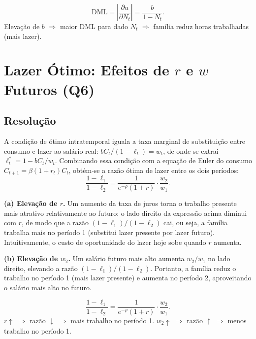 \documentclass[12pt, a4paper]{article}
\begin{document}
\begin{resultbox}[title={Desutilidade Marginal do Trabalho (Q5)}]
\[
\text{DML} = \left|\frac{\partial u}{\partial N_t}\right| = \frac{b}{1-N_t}.
\]
Elevação de $b$ $\Rightarrow$ maior DML para dado $N_t$ $\Rightarrow$ família reduz horas trabalhadas (mais lazer).
\end{resultbox}

\section{Lazer Ótimo: Efeitos de $r$ e $w$ Futuros (Q6)}

\subsection*{Resolução}

A condição de ótimo intratemporal iguala a taxa marginal de substituição entre consumo e lazer ao salário real: $bC_t/(1-\ell_t) = w_t$, de onde se extrai $\ell_t^* = 1 - bC_t/w_t$. Combinando essa condição com a equação de Euler do consumo $C_{t+1} = \beta(1+r_t)C_t$, obtém-se a razão ótima de lazer entre os dois períodos:
\[
\frac{1-\ell_1}{1-\ell_2} = \frac{1}{e^{-\rho}(1+r)}\cdot\frac{w_2}{w_1}.
\]

\textbf{(a) Elevação de $r$.} Um aumento da taxa de juros torna o trabalho presente mais atrativo relativamente ao futuro: o lado direito da expressão acima diminui com $r$, de modo que a razão $(1-\ell_1)/(1-\ell_2)$ cai, ou seja, a família trabalha mais no período 1 (substitui lazer presente por lazer futuro). Intuitivamente, o custo de oportunidade do lazer hoje sobe quando $r$ aumenta.

\textbf{(b) Elevação de $w_2$.} Um salário futuro mais alto aumenta $w_2/w_1$ no lado direito, elevando a razão $(1-\ell_1)/(1-\ell_2)$. Portanto, a família reduz o trabalho no período 1 (mais lazer presente) e aumenta no período 2, aproveitando o salário mais alto no futuro.

\begin{formulabox}[title={Substituição Intertemporal de Lazer/Trabalho (Q6)}]
\[
\frac{1-\ell_1}{1-\ell_2} = \frac{1}{e^{-\rho}(1+r)}\cdot\frac{w_2}{w_1}.
\]
$r\uparrow$ $\Rightarrow$ razão $\downarrow$ $\Rightarrow$ mais trabalho no período 1. \quad $w_2\uparrow$ $\Rightarrow$ razão $\uparrow$ $\Rightarrow$ menos trabalho no período 1.
\end{formulabox}
\end{document}
